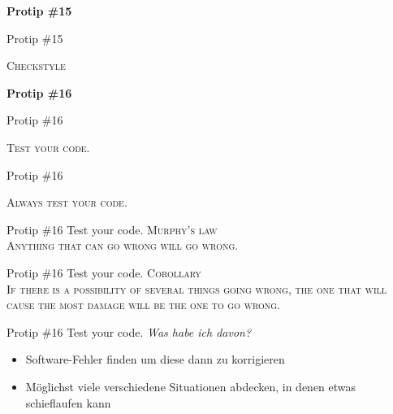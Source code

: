 \documentclass[18pt]{beamer}
\begin{document}
\begin{frame}{\quad}
    \center
    \Huge{\textbf{Protip \#15}}
\end{frame}

\begin{frame}{Protip \#15}
    \begin{block}{}
        \center
        \textsc{Checkstyle}
    \end{block}
\end{frame}

\begin{frame}{\quad}
    \center
    \Huge{\textbf{Protip \#16}}
\end{frame}

\begin{frame}{Protip \#16}
    \begin{block}{}
        \center
        \textsc{Test your code.}
    \end{block}
\end{frame}

\begin{frame}{Protip \#16}
    \begin{alertblock}{}
        \center
        \Huge{\textsc{Always test your code.}}
    \end{alertblock}
\end{frame}

\begin{frame}{Protip \#16 Test your code.}
    \textsc{\LARGE{Murphy's law}}\\
    \textsc{Anything that can go wrong will go wrong.}
\end{frame}

\begin{frame}{Protip \#16 Test your code.}
    \textsc{\LARGE{Corollary}}\\
    \textsc{If there is a possibility of several things going wrong, the one that will cause the most damage will be the one to go wrong.}
\end{frame}

\begin{frame}{Protip \#16 Test your code.}
    \textit{Was habe ich davon?}
    \begin{itemize}
        \item Software-Fehler finden um diese dann zu korrigieren
        \item Möglichst viele verschiedene Situationen abdecken, in denen etwas schieflaufen kann
    \end{itemize}
\end{frame}
\end{document}
